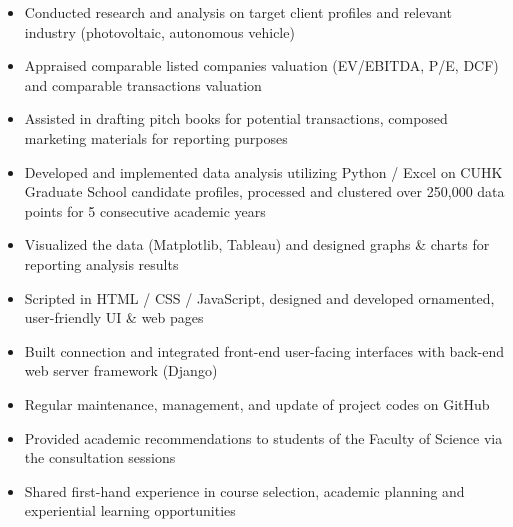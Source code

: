 \documentclass{resume}
\begin{document}
    \begin{itemize}
        \item Conducted research and analysis on target client profiles and relevant industry (photovoltaic, autonomous vehicle)
        \item Appraised comparable listed companies valuation (EV/EBITDA, P/E, DCF) and comparable transactions valuation
        \item Assisted in drafting pitch books for potential transactions, composed marketing materials for reporting purposes
    \end{itemize}
    \begin{itemize}
        \item Developed and implemented data analysis utilizing  Python / Excel on CUHK Graduate School candidate profiles, processed and clustered over 250,000 data points for 5 consecutive academic years
        \item Visualized the data (Matplotlib, Tableau) and designed graphs \& charts for reporting analysis results
    \end{itemize}
    \begin{itemize}
        \item Scripted in HTML / CSS / JavaScript, designed and developed ornamented, user-friendly UI \& web pages
        \item Built connection and integrated front-end user-facing interfaces with back-end web server framework (Django)
        \item Regular maintenance, management, and update of project codes on GitHub
    \end{itemize}
    \begin{itemize}
        \item Provided academic recommendations to students of the Faculty of Science via the consultation sessions
        \item Shared first-hand experience in course selection, academic planning and experiential learning opportunities
    \end{itemize}
    
\end{document}
